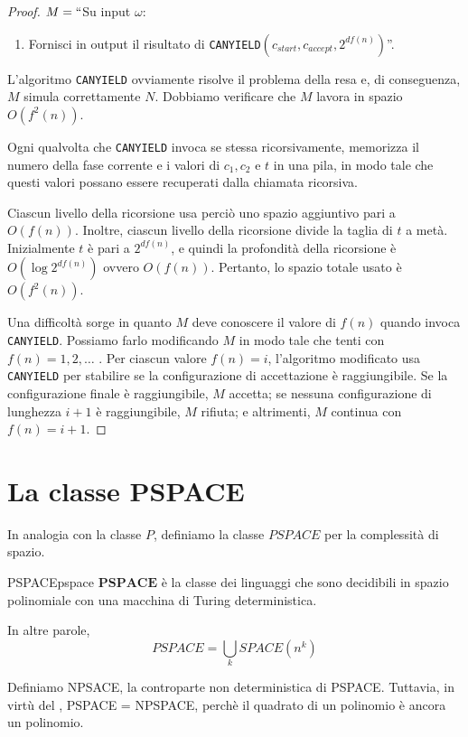 \documentclass[12pt]{report}
\newcounter{definition}
\newcommand{\namerefl}[1]{%
	\bgroup
	\let\nmu\MakeLowercase
	\nameref{#1}\egroup}
\newcommand{\nmu}{}
\begin{document}
\begin{proof}
	$M = ``$Su input $\omega$:
	\begin{enumerate}
		\item Fornisci in output il risultato di \texttt{CANYIELD$\left(c_{start}, c_{accept}, 2^{df(n)}\right)$}''.
	\end{enumerate}

	L'algoritmo \texttt{CANYIELD} ovviamente risolve il problema della resa e, di conseguenza, $M$ simula correttamente $N$. Dobbiamo verificare che $M$ lavora in spazio $O\left(f^2(n)\right)$.

	Ogni qualvolta che \texttt{CANYIELD} invoca se stessa ricorsivamente, memorizza il numero della fase corrente e i valori di $c_1, c_2$ e $t$ in una pila, in modo tale che questi valori possano essere recuperati dalla chiamata ricorsiva.

	Ciascun livello della ricorsione usa perciò uno spazio aggiuntivo pari a $O(f(n))$. Inoltre, ciascun livello della ricorsione divide la taglia di $t$ a metà. Inizialmente $t$ è pari a $2^{df(n)}$, e quindi la profondità della ricorsione è $O\left(\log 2^{df(n)}\right)$ ovvero $O(f(n))$. Pertanto, lo spazio totale usato è $O\left(f^2(n)\right)$.

	Una difficoltà sorge in quanto $M$ deve conoscere il valore di $f(n)$ quando invoca \texttt{CANYIELD}. Possiamo farlo modificando $M$ in modo tale che tenti con $f(n) = 1, 2, \dots$ . Per ciascun valore $f(n) = i$, l'algoritmo modificato usa \texttt{CANYIELD} per stabilire se la configurazione di accettazione è raggiungibile. Se la configurazione finale è raggiungibile, $M$ accetta; se nessuna configurazione di lunghezza $i + 1$ è raggiungibile, $M$ rifiuta; e altrimenti, $M$ continua con $f(n) = i + 1$.
\end{proof}
\section{La classe PSPACE}
In analogia con la classe $P$, definiamo la classe $PSPACE$ per la complessità di spazio.
\begin{definition}{\nmu PSPACE}{pspace}
	$\mathbf{PSPACE}$ è la classe dei linguaggi che sono decidibili in spazio polinomiale con una macchina di Turing deterministica.

	In altre parole,
	\[
	PSPACE = \bigcup_kSPACE\left(n^k\right)
	\]
\end{definition}

Definiamo NPSACE, la controparte non deterministica di PSPACE. Tuttavia, in virtù del \namerefl{th:savitch}, PSPACE = NPSPACE, perchè il quadrato di un polinomio è ancora un polinomio.
\end{document}

